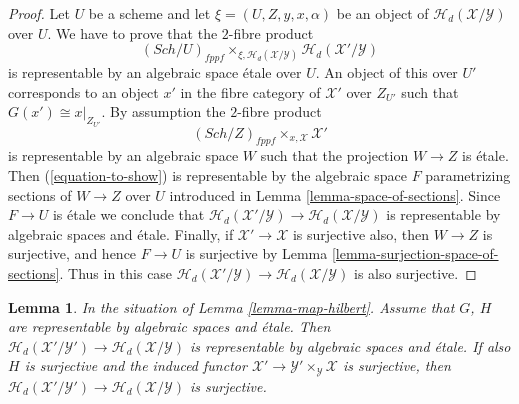 \documentclass{stacks-project}
\theoremstyle{plain}
\newtheorem{lemma}[subsection]{Lemma}
\theoremstyle{definition}
\theoremstyle{remark}
\numberwithin{equation}{subsection}
\def\Sch{\mathit{Sch}}
\begin{document}
\begin{proof}
Let $U$ be a scheme and let $\xi = (U, Z, y, x, \alpha)$ be an object of
$\mathcal{H}_d(\mathcal{X}/\mathcal{Y})$ over $U$.
We have to prove that the $2$-fibre product
\begin{equation}
\label{equation-to-show}
(\Sch/U)_{fppf}
\times_{\xi, \mathcal{H}_d(\mathcal{X}/\mathcal{Y})}
\mathcal{H}_d(\mathcal{X}'/\mathcal{Y})
\end{equation}
is representable by an algebraic space \'etale over $U$.
An object of this over $U'$ corresponds to an object
$x'$ in the fibre category of $\mathcal{X}'$ over $Z_{U'}$
such that $G(x') \cong x|_{Z_{U'}}$.
By assumption the $2$-fibre product
$$
(\Sch/Z)_{fppf} \times_{x, \mathcal{X}} \mathcal{X}'
$$
is representable by an algebraic space $W$ such that the projection
$W \to Z$ is \'etale. Then (\ref{equation-to-show})
is representable by the algebraic space $F$ parametrizing sections of
$W \to Z$ over $U$ introduced in
Lemma \ref{lemma-space-of-sections}.
Since $F \to U$ is \'etale we conclude that
$\mathcal{H}_d(\mathcal{X}'/\mathcal{Y}) \to
\mathcal{H}_d(\mathcal{X}/\mathcal{Y})$ is representable by
algebraic spaces and \'etale.
Finally, if $\mathcal{X}' \to \mathcal{X}$ is surjective also,
then $W \to Z$ is surjective, and hence $F \to U$ is surjective by
Lemma \ref{lemma-surjection-space-of-sections}.
Thus in this case
$\mathcal{H}_d(\mathcal{X}'/\mathcal{Y}) \to
\mathcal{H}_d(\mathcal{X}/\mathcal{Y})$ is also surjective.
\end{proof}

\begin{lemma}
\label{lemma-etale-map-hilbert}
In the situation of
Lemma \ref{lemma-map-hilbert}.
Assume that $G$, $H$ are representable by algebraic spaces and \'etale.
Then $\mathcal{H}_d(\mathcal{X}'/\mathcal{Y}') \to
\mathcal{H}_d(\mathcal{X}/\mathcal{Y})$ is representable by
algebraic spaces and \'etale.
If also $H$ is surjective and the induced functor
$\mathcal{X}' \to \mathcal{Y}' \times_\mathcal{Y} \mathcal{X}$
is surjective, then
$\mathcal{H}_d(\mathcal{X}'/\mathcal{Y}') \to
\mathcal{H}_d(\mathcal{X}/\mathcal{Y})$ is surjective.
\end{lemma}
\end{document}
